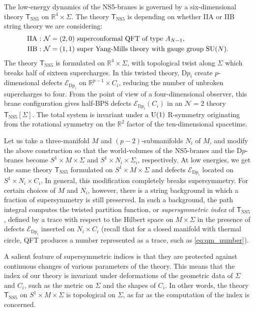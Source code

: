 The low-energy dynamics of the NS5-branes is governed by a six-dimensional
theory $\mathsf{T}_{\mathrm{NS5}}$ on $\mathbb{R}^{4}\times\Sigma$.
The theory $\mathsf{T}_{\mathrm{NS5}}$ is depending on whether IIA
or IIB string theory we are considering:
\begin{align*}
  \textrm{IIA : }  &  \mathcal{N} = (2,0)  \text{ superconformal QFT of type } A_{N-1},  \\
  \textrm{IIB : }  &  \mathcal{N} = (1,1)  \text{ super Yang-Mills theory with gauge group } \mathrm{SU}(N).
\end{align*}
The theory $\mathsf{T}_{\mathrm{NS5}}$ is formulated on $\mathbb{R}^{4}\times\Sigma$,
with topological twist along $\Sigma$ which breaks half of sixteen
supercharges. In this twisted theory, D$p_{i}$ create $p$-dimensional
defects $\mathcal{E}_{\mathrm{D}p_{i}}$ on $\mathbb{R}^{p-1}\times C_{i}$,
reducing the number of unbroken supercharges to four. From the point
of view of a four-dimensional observer, this brane configuration gives
half-BPS defects $\mathcal{E}_{\mathrm{D}p_{i}}(C_{i})$
in an $\mathcal{N}=2$ theory $\mathsf{T}_{\mathrm{NS5}}[\Sigma]$.
The total system is invariant under a $\mathrm{U}(1)$ R-symmetry originating
from the rotational symmetry on the $\mathbb{R}^{2}$ factor of the
ten-dimensional spacetime.

Let us take a three-manifold $M$ and $(p-2)$-submanifolds $N_{i}$
of $M$, and modify the above construction so that the world-volumes
of the NS5-branes and the D$p$-branes become $S^{1}\times M\times\Sigma$
and $S^{1}\times N_{i}\times\Sigma_{i}$, respectively. At low energies,
we get the same theory $\mathsf{T}_{\mathrm{NS5}}$ formulated on
$S^{1}\times M\times\Sigma$ and defects $\mathcal{E}_{\mathrm{D}p_{i}}$
located on $S^{1}\times N_{i}\times C_{i}$. In general, this modification
completely breaks supersymmetry. For certain choices of $M$ and $N_{i}$,
however, there is a string background in which a fraction of supersymmetry
is still preserved. In such a background, the path integral computes
the twisted partition function, or \emph{supersymmetric index} of $\mathsf{T}_{\mathrm{NS5}}$,
defined by a trace with respect to the Hilbert space on $M\times\Sigma$ in the presence
of defects $\mathcal{E}_{\mathrm{D}p_{i}}$ inserted on $N_{i}\times C_{i}$
(recall that for a closed manifold with thermal circle, QFT produces a number represented as a trace,
such as \eqref{eq:qm_number}).

A salient feature of supersymmetric indices is that they are protected
against continuous changes of various parameters of the theory. This
means that the index of our theory is invariant under deformations
of the geometric data of $\Sigma$ and $C_{i}$, such as the metric
on $\Sigma$ and the shapes of $C_{i}$. In other words, the theory
$\mathsf{T}_{\mathrm{NS5}}$ on $S^{1}\times M\times\Sigma$ is topological
on $\Sigma$, as far as the computation of the index is concerned.

